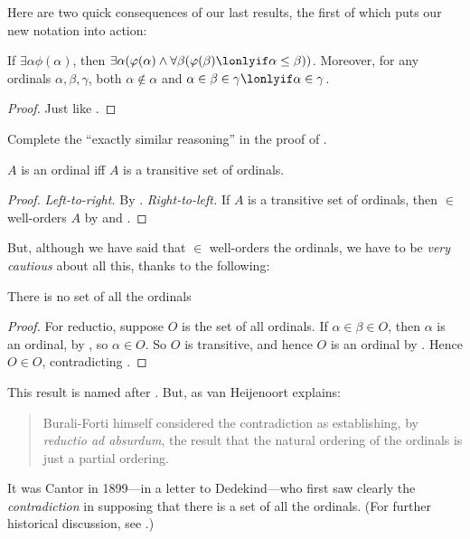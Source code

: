 \documentclass[../../../include/open-logic-section]{subfiles}
\begin{document}
Here are two quick consequences of our last results, the first of
which puts our new notation into action:

\begin{cor}
If $\exists \alpha\phi(\alpha)$, then $\exists \alpha(\phi(\alpha)
\land \forall \beta(\phi(\beta) \lonlyif \alpha \leq \beta))$.
Moreover, for any ordinals $\alpha, \beta, \gamma$, both $\alpha
\notin \alpha$ and $\alpha \in \beta \in \gamma \lonlyif \alpha \in
\gamma$. 
\end{cor}

\begin{proof}
Just like .
\end{proof}

\begin{prob}
Complete the ``exactly similar reasoning'' in the proof of
.
\end{prob}

\begin{cor}
$A$ is an ordinal iff $A$ is a transitive set of ordinals.
\end{cor}

\begin{proof}
\emph{Left-to-right.} By . \emph{Right-to-left.}
If $A$ is a transitive set of ordinals, then $\in$ well-orders $A$ by
 and .
\end{proof}

But, although we have said that $\in$ well-orders the ordinals, we
have to be \emph{very cautious} about all this, thanks to the
following:

\begin{thm}
There is no set of all the ordinals
\end{thm}

\begin{proof}
For reductio, suppose $O$ is the set of all ordinals. If $\alpha \in
\beta \in O$, then $\alpha$ is an ordinal, by , so
$\alpha \in O$. So $O$ is transitive, and hence $O$ is an ordinal by
. Hence $O \in O$, contradicting
. 
\end{proof}

This result is named after \citeauthor{Burali-Forti1897}. But, as van
Heijenoort explains:
\begin{quote}
  Burali-Forti himself considered the contradiction as establishing,
  by \emph{reductio ad absurdum}, the result that the natural ordering
  of the ordinals is just a partial ordering.
  \citep[p.~105]{Heijenoort1967}
\end{quote}
It was Cantor in 1899---in a letter to Dedekind---who first saw
clearly the \emph{contradiction} in supposing that there is a set of
all the ordinals. (For further historical discussion, see
\citealt[p.~105]{Heijenoort1967}.)
\end{document}
